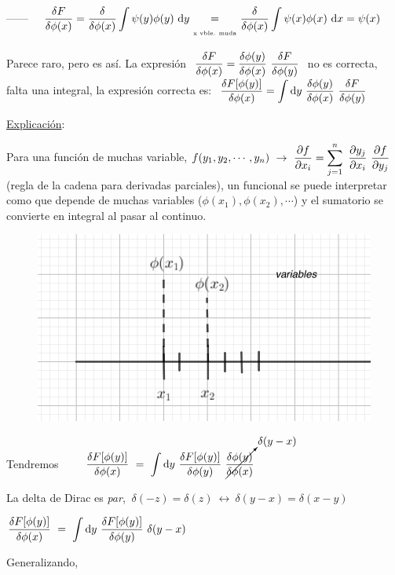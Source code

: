 \vspace{2mm} ------ $\displaystyle \quad  \fdv{F}{\phi(x)} =  \fdv{\phi(x)}  \int \psi(y)\phi(y)\ \dd y 
\ \begin{matrix} \\ = \\ \text{\tiny{x vble. muda}} \end{matrix} \
  \fdv{\phi(x)}  \int \psi(x)\phi(x)\ \dd x = \psi(x)$
  

Parece raro, pero es así.  La expresión $\ \displaystyle \fdv{F}{\phi(x)} = \fdv{\phi(y)}{\phi(x)}\  \fdv{F}{\phi(y)}\ $ no es correcta, falta una integral, la expresión correcta es: $\ \displaystyle \fdv{F[\phi(y)]}{\phi(x)} = \int \dd y\ \fdv{\phi(y)}{\phi(x)}\  \fdv{F}{\phi(y)}\ $

\color{gris} \underline{Explicación}:

\begin{multicols}{2}
\begin{small}
Para una función de muchas variable, $f(y_1, y_2, \cdots, y_n) \ \to \  \displaystyle \pdv{f}{x_i}=\sum_{j=1}^n \ \pdv{y_j}{x_i} \ \pdv{f}{y_j} \ $ (regla de la cadena para derivadas parciales), un funcional se puede interpretar como que depende de muchas variables ($\phi(x_1), \phi(x_2), \cdots $) y el sumatorio se convierte en integral al pasar al continuo.\end{small}

\begin{figure}[H]
	\centering
	\includegraphics[width=.35\textwidth]{imagenes/img37-01.png}
\end{figure}
\end{multicols}
\color{black}

Tendremos $\displaystyle \qquad \fdv{F[\phi(y)]}{\phi(x)} \ = \ \int \dd y \ \fdv{F[\phi(y)]}{\phi(y)} \ \cancelto{\delta(y-x)}{\fdv{\phi(y)}{\phi(x)}}$

\textcolor{gris}{La delta de Dirac es \emph{par}, $\ \delta(-z)=\delta(z) \ \leftrightarrow \ \delta(y-x)=\delta(x-y)$}

$\displaystyle  \fdv{F[\phi(y)]}{\phi(x)} \ = \ \int \dd y \ \fdv{F[\phi(y)]}{\phi(y)} \ \delta(y-x) $

\vspace{2mm} Generalizando, 

